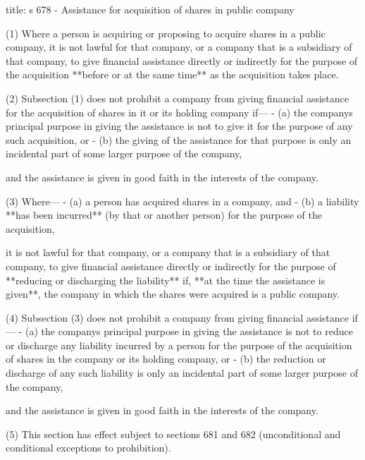 \documentclass[
]{article}
\newenvironment{Shaded}{}{}
\newcommand{\NormalTok}[1]{#1}
\begin{document}
\begin{Shaded}
\begin{Highlighting}[]
\NormalTok{title: s 678 {-} Assistance for acquisition of shares in public company}

\NormalTok{(1) Where a person is acquiring or proposing to acquire shares in a public company, it is not lawful for that company, or a company that is a subsidiary of that company, to give financial assistance directly or indirectly for the purpose of the acquisition **before or at the same time** as the acquisition takes place.}

\NormalTok{(2) Subsection (1) does not prohibit a company from giving financial assistance for the acquisition of shares in it or its holding company if—}
\NormalTok{{-} (a) the company\textquotesingle{}s principal purpose in giving the assistance is not to give it for the purpose of any such acquisition, or}
\NormalTok{{-} (b) the giving of the assistance for that purpose is only an incidental part of some larger purpose of the company,}

\NormalTok{and the assistance is given in good faith in the interests of the company.}

\NormalTok{(3) Where—}
\NormalTok{{-} (a) a person has acquired shares in a company, and}
\NormalTok{{-} (b) a liability **has been incurred** (by that or another person) for the purpose of the acquisition,}

\NormalTok{it is not lawful for that company, or a company that is a subsidiary of that company, to give financial assistance directly or indirectly for the purpose of **reducing or discharging the liability** if, **at the time the assistance is given**, the company in which the shares were acquired is a public company.}

\NormalTok{(4) Subsection (3) does not prohibit a company from giving financial assistance if—}
\NormalTok{{-} (a) the company\textquotesingle{}s principal purpose in giving the assistance is not to reduce or discharge any liability incurred by a person for the purpose of the acquisition of shares in the company or its holding company, or}
\NormalTok{{-} (b) the reduction or discharge of any such liability is only an incidental part of some larger purpose of the company,}

\NormalTok{and the assistance is given in good faith in the interests of the company.}

\NormalTok{(5) This section has effect subject to sections 681 and 682 (unconditional and conditional exceptions to prohibition).}
\end{Highlighting}
\end{Shaded}
\end{document}
